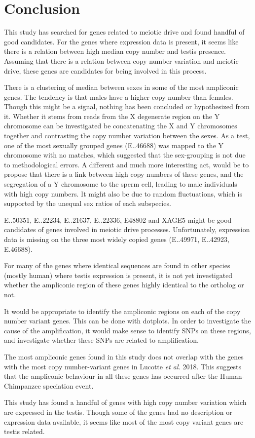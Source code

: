 \section*{Conclusion}

This study has searched for genes related to meiotic drive and found handful of good candidates. For the genes where expression data is present, it seems like there is a relation between high median copy number and testis presence. Assuming that there is a relation between copy number variation and meiotic drive, these genes are candidates for being involved in this process.

There is a clustering of median between sexes in some of the most ampliconic genes. The tendency is that males have a higher copy number than females. Though this might be a signal, nothing has been concluded or hypothesized from it. Whether it stems from reads from the X degenerate region on the Y chromosome can be investigated be concatenating the X and Y chromosomes together and contrasting the copy number variation between the sexes. As a test, one of the most sexually grouped genes (E..46688) was mapped to the Y chromosome with no matches, which suggested that the sex-grouping is not due to methodological errors. A different and much more interesting act, would be to propose that there is a link between high copy numbers of these genes, and the segregation of a Y chromosome to the sperm cell, leading to male individuals with high copy numbers. It might also be due to random fluctuations, which is supported by the unequal sex ratios of each subspecies.


E..50351, E..22234, E..21637, E..22336, E48802 and XAGE5 might be good candidates of genes involved in meiotic drive processes. Unfortunately, expression data is missing on the three most widely copied genes (E..49971, E..42923, E.46688).

For many of the genes where identical sequences are found in other species (mostly human) where testis expression is present, it is not yet investigated whether the ampliconic region of these genes highly identical to the ortholog or not.

It would be appropriate to identify the ampliconic regions on each of the copy number variant genes. This can be done with dotplots. In order to investigate the cause of the amplification, it would make sense to identify SNPs on these regions, and investigate whether these SNPs are related to amplification.

The most ampliconic genes found in this study does not overlap with the genes with the most copy number-variant genes in Lucotte \textit{et al.} 2018. This suggests that the ampliconic behaviour in all these genes has occurred after the Human-Chimpanzee speciation event.

This study has found a handful of genes with high copy number variation which are expressed in the testis. Though some of the genes had no description or expression data available, it seems like most of the most copy variant genes are testis related.

